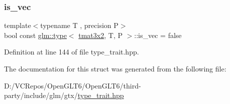\subsubsection{\texorpdfstring{is\_vec}{is\_vec}}
{\footnotesize\ttfamily template$<$typename T , precision P$>$ \\
bool const \mbox{\hyperlink{structglm_1_1type}{glm\+::type}}$<$ \mbox{\hyperlink{structglm_1_1tmat3x2}{tmat3x2}}, T, P $>$\+::is\+\_\+vec = false\hspace{0.3cm}{\ttfamily [static]}}



Definition at line 144 of file type\+\_\+trait.\+hpp.



The documentation for this struct was generated from the following file\+:\begin{DoxyCompactItemize}
\item 
D\+:/\+V\+C\+Repos/\+Open\+G\+L\+T6/\+Open\+G\+L\+T6/third-\/party/include/glm/gtx/\mbox{\hyperlink{type__trait_8hpp}{type\+\_\+trait.\+hpp}}\end{DoxyCompactItemize}

